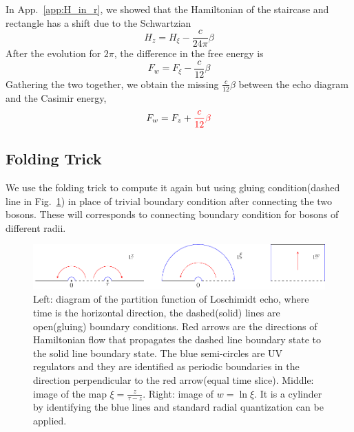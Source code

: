 \documentclass{article}
\begin{document}
In App.~\ref{app:H_in_r}, we showed that the Hamiltonian of the staircase and rectangle has a shift due to the Schwartzian
\begin{equation}
H_{z} = H_{\xi} - \frac{c}{24\pi} \beta 
\end{equation}
After the evolution for $2\pi$, the difference in the free energy is
\begin{equation}
F_w = F_{\xi} - \frac{c}{12} \beta 
\end{equation}
Gathering the two together, we obtain the missing $\frac{c}{12} \beta$ between the echo diagram and the Casimir energy, 
\begin{equation}
F_{w} = F_z + {\color{red} \frac{c}{12}\beta }
\end{equation}


\subsection{Folding Trick}


We use the folding trick to compute it again but using gluing condition(dashed line in Fig.~\ref{fig:H-tau_fold}) in place of trivial boundary condition after connecting the two bosons. These will corresponds to connecting boundary condition for bosons of different radii.

\begin{figure}[htb]
\centering
\includegraphics[width=\textwidth]{fig_H-tau_fold}
\caption{Left: diagram of the partition function of Loschimidt echo, where time is the horizontal direction, the dashed(solid) lines are open(gluing) boundary conditions. Red arrows are the directions of Hamiltonian flow that propagates the dashed line boundary state to the solid line boundary state. The blue semi-circles are UV regulators and they are identified as periodic boundaries in the direction perpendicular to the red arrow(equal time slice). Middle: image of the map $\xi = \frac{z}{\tau - z}$. Right: image of $w = \ln \xi$. It is a cylinder by identifying the blue lines and standard radial quantization can be applied. }
\label{fig:H-tau_fold}
\end{figure}
\end{document}
